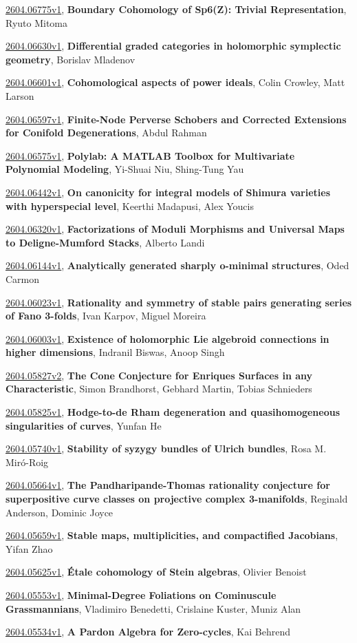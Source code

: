 \documentclass[9pt, a4paper]{article}
\theoremstyle{plain}
\theoremstyle{definition}
\theoremstyle{remark}
\newcommand{\arxiv}[3]{\href{https://arxiv.org/abs/#1}{#1}, \textbf{\textcolor{arxivblue}{#2}}, #3}
\begin{document}
\arxiv{2604.06775v1}{Boundary Cohomology of Sp6(Z): Trivial Representation}{Ryuto Mitoma}

\arxiv{2604.06630v1}{Differential graded categories in holomorphic symplectic geometry}{Borislav Mladenov}

\arxiv{2604.06601v1}{Cohomological aspects of power ideals}{Colin Crowley, Matt Larson}

\arxiv{2604.06597v1}{Finite-Node Perverse Schobers and Corrected Extensions for Conifold Degenerations}{Abdul Rahman}

\arxiv{2604.06575v1}{Polylab: A MATLAB Toolbox for Multivariate Polynomial Modeling}{Yi-Shuai Niu, Shing-Tung Yau}

\arxiv{2604.06442v1}{On canonicity for integral models of Shimura varieties with hyperspecial level}{Keerthi Madapusi, Alex Youcis}

\arxiv{2604.06320v1}{Factorizations of Moduli Morphisms and Universal Maps to Deligne-Mumford Stacks}{Alberto Landi}

\arxiv{2604.06144v1}{Analytically generated sharply o-minimal structures}{Oded Carmon}

\arxiv{2604.06023v1}{Rationality and symmetry of stable pairs generating series of Fano 3-folds}{Ivan Karpov, Miguel Moreira}

\arxiv{2604.06003v1}{Existence of holomorphic Lie algebroid connections in higher dimensions}{Indranil Biswas, Anoop Singh}

\arxiv{2604.05827v2}{The Cone Conjecture for Enriques Surfaces in any Characteristic}{Simon Brandhorst, Gebhard Martin, Tobias Schnieders}

\arxiv{2604.05825v1}{Hodge-to-de Rham degeneration and quasihomogeneous singularities of curves}{Yunfan He}

\arxiv{2604.05740v1}{Stability of syzygy bundles of Ulrich bundles}{Rosa M. Miró-Roig}

\arxiv{2604.05664v1}{The Pandharipande-Thomas rationality conjecture for superpositive curve classes on projective complex 3-manifolds}{Reginald Anderson, Dominic Joyce}

\arxiv{2604.05659v1}{Stable maps, multiplicities, and compactified Jacobians}{Yifan Zhao}

\arxiv{2604.05625v1}{Étale cohomology of Stein algebras}{Olivier Benoist}

\arxiv{2604.05553v1}{Minimal-Degree Foliations on Cominuscule Grassmannians}{Vladimiro Benedetti, Crislaine Kuster, Muniz Alan}

\arxiv{2604.05534v1}{A Pardon Algebra for Zero-cycles}{Kai Behrend}
\end{document}
